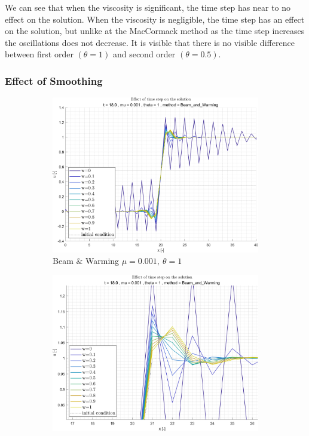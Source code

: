 \documentclass[11pt, a4paper]{article}
\begin{document}
We can see that when the viscosity is significant, the time step has near to no effect on the solution. When the viscosity is negligible, the time step has an effect on the solution, but unlike at the MacCormack method as the time step increases the oscillations does not decrease. It is visible that there is no visible difference between first order $\left(\theta=1\right)$ and second order $\left(\theta=0.5\right)$.

\subsubsection{Effect of Smoothing}
\begin{figure}[H]
    \centering
    \begin{subfigure}[c]{.38\textwidth}
        \centering
        \includegraphics[width=\textwidth]{images/grap16.png}
        \caption{Beam $\&$ Warming $\mu=0.001,\ \theta=1$}
        \label{fig:Beam & Warming_general_mu0.001_theta1_A_diff_w}
    \end{subfigure}
    \begin{subfigure}[c]{.38\textwidth}
        \centering
        \includegraphics[width=\textwidth]{images/grap16.1.png}

\end{subfigure}
\end{figure}
\end{document}
